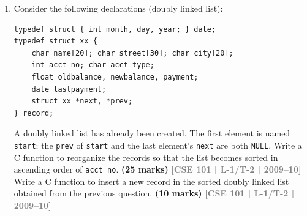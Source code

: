 \documentclass[12pt,a3paper]{article}
\newcommand{\yr}[1]{\hfill\textcolor{gray}{\small\textbf{[#1]}}}
\newcommand{\mk}[1]{\textcolor{orange!70!black}{\small\textbf{(#1 marks)}}}
\begin{document}
\begin{enumerate}
\begin{enumerate}
\begin{center}
\end{center}
\mk{7} \yr{CSE 101 | L-1/T-2 | 2009--10}

\item Write an insertion function for the triangular array above which inserts elements so that they become row- and column-wise sorted.
\mk{7} \yr{CSE 101 | L-1/T-2 | 2009--10}

\item Write an efficient search function that searches an element in the triangular array and returns the row and column position as a \texttt{double} in the format \texttt{row.column} if present, or \texttt{-1.0} if absent.
\mk{7} \yr{CSE 101 | L-1/T-2 | 2009--10}

\item Write a fetch function that retrieves a value from a given row and column position in the triangular array, or returns \texttt{-1.0} if the position is invalid.
\mk{7} \yr{CSE 101 | L-1/T-2 | 2009--10}
\end{enumerate}

\item Consider the following declarations (doubly linked list):
\begin{lstlisting}
typedef struct { int month, day, year; } date;
typedef struct xx {
    char name[20]; char street[30]; char city[20];
    int acct_no; char acct_type;
    float oldbalance, newbalance, payment;
    date lastpayment;
    struct xx *next, *prev;
} record;
\end{lstlisting}
A doubly linked list has already been created. The first element is named \texttt{start}; the \texttt{prev} of \texttt{start} and the last element's \texttt{next} are both \texttt{NULL}. Write a C function to reorganize the records so that the list becomes sorted in ascending order of \texttt{acct\_no}.
\mk{25} \yr{CSE 101 | L-1/T-2 | 2009--10}\\
Write a C function to insert a new record in the sorted doubly linked list obtained from the previous question.
\mk{10} \yr{CSE 101 | L-1/T-2 | 2009--10}


\end{enumerate}
\end{document}
